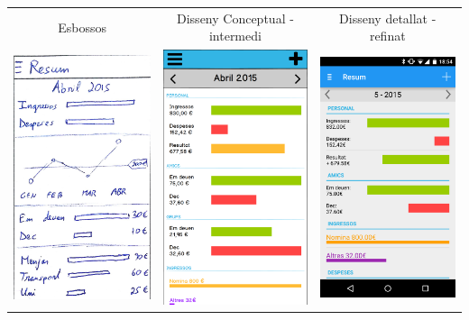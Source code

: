 \begin{table}
\begin{tabular}{| c | c | c |}
\hline
Esbossos & Disseny Conceptual - intermedi & Disseny detallat - refinat \\
\includegraphics[width=50mm]{1_Dashboard.jpg} &
\includegraphics[width=50mm]{2_Dashboard.png} &
\includegraphics[width=50mm]{3_Dashboard.png} \\

\end{tabular}
\end{table}
